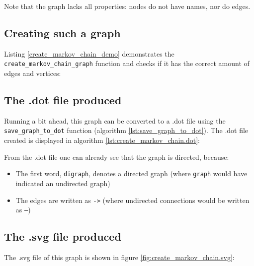 Note that the graph lacks all properties: nodes do not have names, nor do
edges.

\subsection{Creating such a graph}

Listing \ref{create_markov_chain_demo} demonstrates 
the \verb;create_markov_chain_graph; function and checks if it
has the correct amount of edges and vertices:



\subsection{The .dot file produced}
\label{subsec:create_markov_chain_dot}

Running a bit ahead, this graph can be converted to a .dot file using the
\verb;save_graph_to_dot; function (algorithm \ref{lst:save_graph_to_dot}).
The .dot file created is displayed in algorithm \ref{lst:create_markov_chain.dot}:

%
%
%

From the .dot file one can already see that the graph is directed, because:

\begin{itemize}
  \item The first word, \verb;digraph;, denotes a directed graph 
    (where \verb;graph; would have indicated an undirected graph)
  \item The edges are written as \verb;->; 
   (where undirected connections would be written as \verb;–;)
\end{itemize}

\subsection{The .svg file produced}
\label{subsec:create_markov_chain.svg}

The .svg file of this graph is shown in figure \ref{fig:create_markov_chain.svg}:

